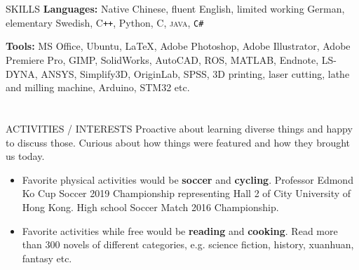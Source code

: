 \documentclass{my_cv}
\begin{document}
\begin{multicols}{2}

\section{\faList}{SKILLS}
\textbf{Languages:} Native Chinese, fluent English, limited working German, elementary Swedish, C\texttt{++}, Python, C, \textsc{java}, \texttt{C\#}

\noindent\textbf{Tools:} MS Office, Ubuntu, \LaTeX, Adobe Photoshop, Adobe Illustrator, Adobe Premiere Pro, GIMP, SolidWorks, AutoCAD, ROS, MATLAB, Endnote, LS-DYNA, ANSYS, Simplify3D, OriginLab, SPSS, 3D printing, laser cutting, lathe and milling machine, Arduino, STM32 etc.

\section{\faSoccerBallO}{ACTIVITIES / INTERESTS}
Proactive about learning diverse things and happy to discuss those. Curious about how things were featured and how they brought us today. 
\begin{itemize}[noitemsep]
    \item Favorite physical activities would be \textbf{soccer} and \textbf{cycling}. Professor Edmond Ko Cup Soccer 2019 Championship representing Hall 2 of City University of Hong Kong. High school Soccer Match 2016 Championship.
    \item Favorite activities while free would be \textbf{reading} and \textbf{cooking}. Read more than 300 novels of different categories, e.g. science fiction, history, xuanhuan, fantasy etc.
\end{itemize}
\columnbreak


\end{multicols}
\end{document}
